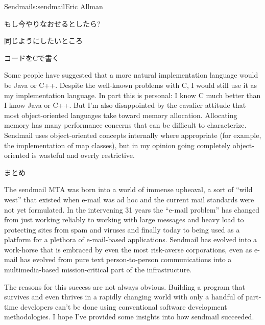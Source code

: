 \begin{aosachapter}{Sendmail}{s:sendmail}{Eric Allman}
\begin{aosasect1}{もし今やりなおせるとしたら?}
\begin{aosasect2}{同じようにしたいところ}
\begin{aosasect3}{コードをCで書く}

Some people have suggested that a more natural implementation language
would be Java or C++. Despite the well-known problems with C, I would
still use it as my implementation language. In part this is personal:
I know C much better than I know Java or C++. But I'm also
disappointed by the cavalier attitude that most object-oriented
languages take toward memory allocation. Allocating memory has many
performance concerns that can be difficult to characterize.  Sendmail
uses object-oriented concepts internally where appropriate (for
example, the implementation of map classes), but in my opinion going
completely object-oriented is wasteful and overly restrictive.

\end{aosasect3}

\end{aosasect2}

\end{aosasect1}

\begin{aosasect1}{まとめ}

The sendmail MTA was born into a world of immense upheaval, a sort of
``wild west'' that existed when e-mail was ad hoc and the current mail
standards were not yet formulated.  In the intervening 31 years the
``e-mail problem'' has changed from just working reliably to working
with large messages and heavy load to protecting sites from spam and
viruses and finally today to being used as a platform for a plethora
of e-mail-based applications.  Sendmail has evolved into a work-horse
that is embraced by even the most risk-averse corporations, even as
e-mail has evolved from pure text person-to-person communications into
a multimedia-based mission-critical part of the infrastructure.

The reasons for this success are not always obvious.  Building a
program that survives and even thrives in a rapidly changing world
with only a handful of part-time developers can't be done using
conventional software development methodologies.  I hope I've provided
some insights into how sendmail succeeded.

\end{aosasect1}

\end{aosachapter}
